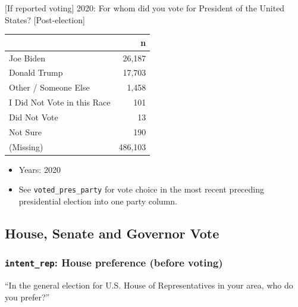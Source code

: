 \documentclass[10pt,article,oneside]{memoir}
\theoremstyle{definition}
\begin{document}
{[}If reported voting{]} 2020: For whom did you vote for President of
the United States? {[}Post-election{]}

\begin{table}[H]
\centering
\begin{tabular}{lr}
\toprule
 & n\\
\midrule
Joe Biden & 26,187\\
Donald Trump & 17,703\\
Other / Someone Else & 1,458\\
I Did Not Vote in this Race & 101\\
Did Not Vote & 13\\
Not Sure & 190\\
(Missing) & 486,103\\
\bottomrule
\end{tabular}
\end{table}

\begin{itemize}
\tightlist
\item
  Years: 2020
\item
  See \texttt{voted\_pres\_party} for vote choice in the most recent
  preceding presidential election into one party column.
\end{itemize}

\hypertarget{house-senate-and-governor-vote}{%
\subsection{House, Senate and Governor
Vote}\label{house-senate-and-governor-vote}}

\hypertarget{intent_rep-house-preference-before-voting}{%
\subsubsection{\texorpdfstring{\texttt{intent\_rep}: House preference
(before
voting)}{intent\_rep: House preference (before voting)}}\label{intent_rep-house-preference-before-voting}}

``In the general election for U.S. House of Representatives in your
area, who do you prefer?''
\end{document}
